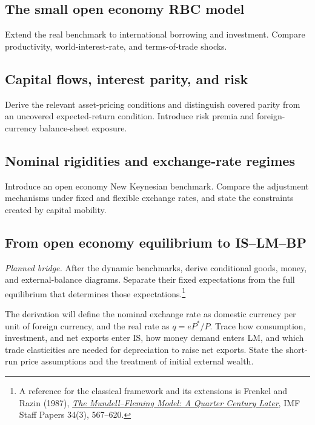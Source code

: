 \label{sec:open-fluctuations}

\subsection{The small open economy RBC model}
Extend the real benchmark to international borrowing and investment.
Compare productivity, world-interest-rate, and terms-of-trade shocks.

\subsection{Capital flows, interest parity, and risk}
Derive the relevant asset-pricing conditions and distinguish covered parity
from an uncovered expected-return condition. Introduce risk premia and
foreign-currency balance-sheet exposure.

\subsection{Nominal rigidities and exchange-rate regimes}
Introduce an open economy New Keynesian benchmark. Compare the adjustment
mechanisms under fixed and flexible exchange rates, and state the constraints
created by capital mobility.

\subsection{From open economy equilibrium to IS--LM--BP}
\label{sec:open-islmbp}

\textit{Planned bridge.} After the dynamic benchmarks, derive conditional goods,
money, and external-balance diagrams. Separate their fixed expectations from
the full equilibrium that determines those expectations.\footnote{A
reference for the classical framework and its extensions is Frenkel and Razin
(1987), \href{https://www.elibrary.imf.org/view/journals/024/1987/003/article-A001-en.xml}{\textit{The Mundell--Fleming Model: A Quarter Century Later}},
IMF Staff Papers 34(3), 567--620.}

The derivation will define the nominal exchange rate as domestic currency per
unit of foreign currency, and the real rate as $q=eP^*/P$. Trace how consumption,
investment, and net exports enter IS, how money demand enters LM, and which
trade elasticities are needed for depreciation to raise net exports. State the
short-run price assumptions and the treatment of initial external wealth.

